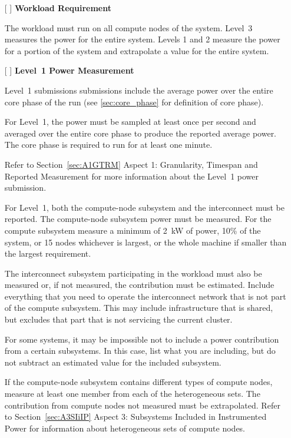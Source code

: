 \begin{itemize}
\item[{[ ]}]
\textbf{Workload Requirement}

The workload must run on all compute nodes of the system. Level~3 measures the power for the entire system. Levels 1 and 2 measure the power for a portion of the system and extrapolate a value for the entire system. 

\item[{[ ]}]
\textbf{Level~1 Power Measurement}

Level~1 submissions submissions include the average power over the entire core phase of the run (see \ref{sec:core_phase} for definition of core phase).

For Level~1, the power must be sampled at least once per second and averaged over the entire core phase to produce the reported average power.
The core phase is required to run for at least one minute.

Refer to Section~\ref{sec:A1GTRM} Aspect 1: Granularity, Timespan and Reported Measurement for more information about the
Level~1 power submission.

For Level~1, both the compute-node subsystem and the interconnect must be reported.  
The compute-node subsystem power must be measured. 
For the compute subsystem measure a minimum of 2~kW of power, 
10\% of the system, or 15 nodes whichever is largest, or the whole machine if smaller than the largest requirement.

The interconnect subsystem participating in the workload must also be measured or, if not measured, the contribution must be estimated.
Include everything that you need to operate the interconnect network that is not part of the compute subsystem. 
This may include infrastructure that is shared, but excludes that part that is not servicing the current cluster.

For some systems, it may be impossible not to include a power contribution from a certain subsystems. 
In this case, list what you are including, but do not subtract an estimated value for the included subsystem.

If the compute-node subsystem contains different types of compute nodes, measure at least one member from each of the heterogeneous sets. The contribution from compute nodes not measured must be extrapolated. Refer to 
Section~\ref{sec:A3SIiIP} Aspect 3: Subsystems Included in Instrumented Power for information about
 heterogeneous sets of compute nodes.


\end{itemize}

